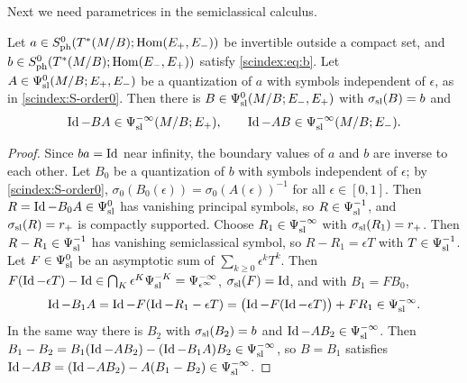 Next we need parametrices in the semiclassical calculus.

\begin{lemma}\label{scindex:lem:sl-parametrix}
  Let $a\in S^{0}_{\mathrm{ph}}(T^*(M/B);\operatorname{Hom}(E_+,E_-))$ be invertible outside a compact set,
  and $b\in S^{0}_{\mathrm{ph}}(T^*(M/B);\operatorname{Hom}(E_-,E_+))$ satisfy \eqref{scindex:eq:b}. Let
  $A\in\Psi^{0}_{\mathrm{sl}}(M/B;E_+,E_-)$ be a quantization of $a$ with symbols independent of
  $\epsilon$, as in \ref{scindex:S-order0}. Then there is
  $B\in\Psi^{0}_{\mathrm{sl}}(M/B;E_-,E_+)$ with $\sigma_{\mathrm{sl}}(B)=b$ and
  \begin{equation*}
    \operatorname{Id}-BA\in\Psi^{-\infty}_{\mathrm{sl}}(M/B;E_+),\qquad\operatorname{Id}-AB\in\Psi^{-\infty}_{\mathrm{sl}}(M/B;E_-).
  \end{equation*}
\end{lemma}
\begin{proof}
  Since $ba=\operatorname{Id}$ near infinity, the boundary values of $a$ and $b$ are inverse
  to each other. Let $B_0$ be a quantization of $b$ with symbols independent of
  $\epsilon$; by \ref{scindex:S-order0}, $\sigma_0(B_0(\epsilon))=
  \sigma_0(A(\epsilon))^{-1}$ for all $\epsilon\in[0,1]$. Then
  $R=\operatorname{Id}-B_0A\in\Psi^{0}_{\mathrm{sl}}$ has vanishing principal symbols, so $R\in\Psi^{-1}_{\mathrm{sl}}$,
  and $\sigma_{\mathrm{sl}}(R)=r_+$ is compactly supported. Choose $R_1\in\Psi^{-\infty}_{\mathrm{sl}}$ with
  $\sigma_{\mathrm{sl}}(R_1)=r_+$. Then $R-R_1\in\Psi^{-1}_{\mathrm{sl}}$ has vanishing semiclassical symbol,
  so $R-R_1=\epsilon T$ with $T\in\Psi^{-1}_{\mathrm{sl}}$. Let $F\in\Psi^{0}_{\mathrm{sl}}$ be an asymptotic
  sum of $\sum_{k\ge0}\epsilon^kT^k$. Then $F(\operatorname{Id}-\epsilon T)-\operatorname{Id}\in
  \bigcap_K\epsilon^K\Psi^{-K}_{\mathrm{sl}}=\Psi^{-\infty}_{\epsilon^\infty}$, $\sigma_{\mathrm{sl}}(F)=\operatorname{Id}$, and with $B_1=FB_0$,
  \begin{equation*}
    \operatorname{Id}-B_1A=\operatorname{Id}-F(\operatorname{Id}-R_1-\epsilon T)=\bigl(\operatorname{Id}-F(\operatorname{Id}-\epsilon T)\bigr)+FR_1
    \in\Psi^{-\infty}_{\mathrm{sl}}.
  \end{equation*}
  In the same way there is $B_2$ with $\sigma_{\mathrm{sl}}(B_2)=b$ and $\operatorname{Id}-AB_2\in
  \Psi^{-\infty}_{\mathrm{sl}}$. Then $B_1-B_2=B_1(\operatorname{Id}-AB_2)-(\operatorname{Id}-B_1A)B_2\in\Psi^{-\infty}_{\mathrm{sl}}$,
  so $B=B_1$ satisfies $\operatorname{Id}-AB=(\operatorname{Id}-AB_2)-A(B_1-B_2)\in\Psi^{-\infty}_{\mathrm{sl}}$.
\end{proof}

